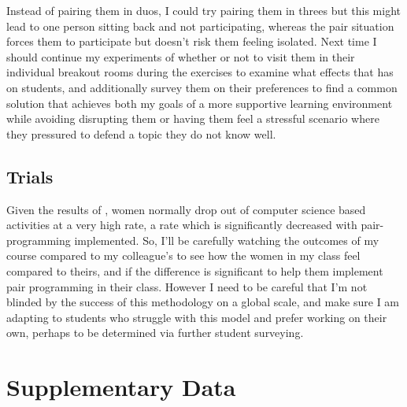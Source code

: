 \documentclass[paper=a4,justified,a4paper]{tufte-handout}
\begin{document}
Instead of pairing them in duos, I could try pairing them in threes but
this might lead to one person sitting back and not participating,
whereas the pair situation forces them to participate but doesn't risk
them feeling isolated. Next time I should continue my experiments of
whether or not to visit them in their individual breakout rooms during
the exercises to examine what effects that has on students, and
additionally survey them on their preferences to find a common solution
that achieves both my goals of a more supportive learning environment
while avoiding disrupting them or having them feel a stressful scenario
where they pressured to defend a topic they do not know well.

\hypertarget{trials}{%
\subsection{Trials}\label{trials}}

Given the results of \citet{werner2004pair}, women normally drop out of
computer science based activities at a very high rate, a rate which is
significantly decreased with pair-programming implemented. So, I'll be
carefully watching the outcomes of my course compared to my colleague's
to see how the women in my class feel compared to theirs, and if the
difference is significant to help them implement pair programming in
their class. However I need to be careful that I'm not blinded by the
success of this methodology on a global scale, and make sure I am
adapting to students who struggle with this model and prefer working on
their own, perhaps to be determined via further student surveying.

\renewcommand\refname{References}




\section{Supplementary Data}


\end{document}
